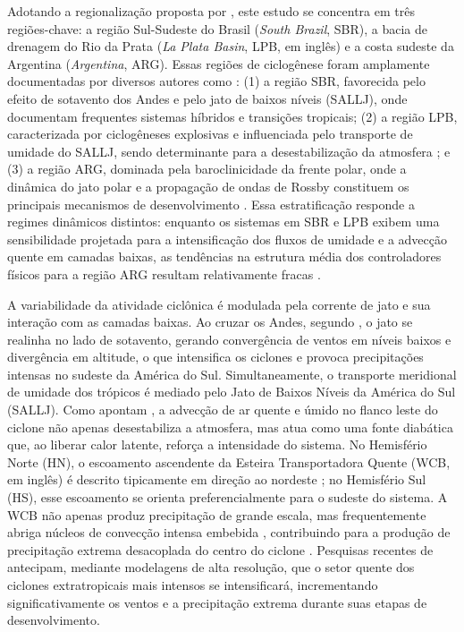 \label{sec:definicion_regiones}%
Adotando a regionalização proposta por \citet{gramcianinov2019properties}, este estudo se concentra em três regiões-chave: a região Sul-Sudeste do Brasil (\textit{South Brazil}, SBR), a bacia de drenagem do Rio da Prata (\textit{La Plata Basin}, LPB, em inglês) e a costa sudeste da Argentina (\textit{Argentina}, ARG). Essas regiões de ciclogênese foram amplamente documentadas por diversos autores como \citet{reboita2010south, crespo2020potential, gramcianinov2019properties, reboita2026meteorology}: (1) a região SBR, favorecida pelo efeito de sotavento dos Andes e pelo jato de baixos níveis (SALLJ), onde \citet{reboita2022from} documentam frequentes sistemas híbridos e transições tropicais; (2) a região LPB, caracterizada por ciclogêneses explosivas e influenciada pelo transporte de umidade do SALLJ, sendo determinante para a desestabilização da atmosfera \citep{crespo2020potential}; e (3) a região ARG, dominada pela baroclinicidade da frente polar, onde a dinâmica do jato polar e a propagação de ondas de Rossby constituem os principais mecanismos de desenvolvimento \citep{simmonds2000variability}. Essa estratificação responde a regimes dinâmicos distintos: enquanto os sistemas em SBR e LPB exibem uma sensibilidade projetada para a intensificação dos fluxos de umidade e a advecção quente em camadas baixas, as tendências na estrutura média dos controladores físicos para a região ARG resultam relativamente fracas \citep{gramcianinov2024early}.

A variabilidade da atividade ciclônica é modulada pela corrente de jato e sua interação com as camadas baixas. Ao cruzar os Andes, segundo \citet{vera2002cold}, o jato se realinha no lado de sotavento, gerando convergência de ventos em níveis baixos e divergência em altitude, o que intensifica os ciclones e provoca precipitações intensas no sudeste da América do Sul. Simultaneamente, o transporte meridional de umidade dos trópicos é mediado pelo Jato de Baixos Níveis da América do Sul (SALLJ). Como apontam \citet{reboita2022from}, a advecção de ar quente e úmido no flanco leste do ciclone não apenas desestabiliza a atmosfera, mas atua como uma fonte diabática que, ao liberar calor latente, reforça a intensidade do sistema.
No Hemisfério Norte (HN), o escoamento ascendente da Esteira Transportadora Quente (WCB, em inglês) é descrito tipicamente em direção ao nordeste \citep{blanchard2021warm}; no Hemisfério Sul (HS), esse escoamento se orienta preferencialmente para o sudeste do sistema.
A WCB não apenas produz precipitação de grande escala, mas frequentemente abriga núcleos de convecção intensa embebida \citep{oertel2021warm}, contribuindo para a produção de precipitação extrema desacoplada do centro do ciclone \citep{naud2020evaluation}. Pesquisas recentes de \citet{gentile2025response} antecipam, mediante modelagens de alta resolução, que o setor quente dos ciclones extratropicais mais intensos se intensificará, incrementando significativamente os ventos e a precipitação extrema durante suas etapas de desenvolvimento.

